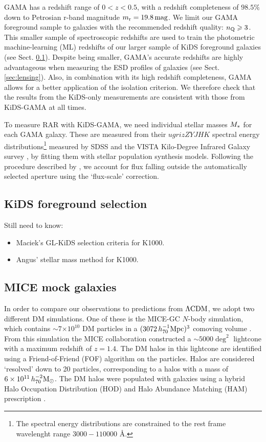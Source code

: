 \documentclass[usenatbib]{mnras}
\newcommand{\magn}{\, {\rm mag} }
\newcommand{\hsmsun}{\,h_{70}^{-2} {\rm M_\odot}}
\newcommand{\hsMpc}{\, h_{70}^{-1}{\rm{Mpc}} }
\newcommand{\lcdm}{{\rm \Lambda CDM}}
\newcommand*{\E}[1]{\times 10^{#1}}
\newcommand{\un}[1]{_{\rm #1}}
\begin{document}
GAMA has a redshift range of $0<z<0.5$, with a redshift completeness of $98.5\%$ down to Petrosian r-band magnitude $m\un{r} = 19.8 \magn$. We limit our GAMA foreground sample to galaxies with the recommended redshift quality: $n\un{Q}\geq3$. This smaller sample of spectroscopic redshifts are used to train the photometric machine-learning (ML) redshifts of our larger sample of KiDS foreground galaxies (see Sect. \ref{sec:gamalike_kids}). Despite being smaller, GAMA's accurate redshifts are highly advantageous when measuring the ESD profiles of galaxies (see Sect. \ref{sec:lensing}). Also, in combination with its high redshift completeness, GAMA allows for a better application of the isolation criterion. We therefore check that the results from the KiDS-only measurements are consistent with those from KiDS-GAMA at all times.

To measure RAR with KiDS-GAMA, we need individual stellar masses $M\un{*}$ for each GAMA galaxy. These are measured from their $ugrizZYJHK$ spectral energy distributions\footnote{The spectral energy distributions are constrained to the rest frame wavelenght range $3000-110000$ \AA.} measured by SDSS and the VISTA Kilo-Degree Infrared Galaxy survey \cite[VIKING,][]{edge2013}, by fitting them with \cite{bruzual2003} stellar population synthesis models. Following the procedure described by \cite{taylor2011}, we account for flux falling outside the automatically selected aperture using the `flux-scale' correction.

\subsection{KiDS foreground selection}
\label{sec:gamalike_kids}
Still need to know:
\begin{itemize}
	\item Maciek's GL-KiDS selection criteria for K1000.
	\item Angus' stellar mass method for K1000.
\end{itemize}

\subsection{MICE mock galaxies}
\label{sec:mice_mocks}

In order to compare our observations to predictions from $\lcdm$, we adopt two different DM simulations. One of these is the MICE-GC $N$-body simulation, which contains $\sim 7$$\E{10}$ DM particles in a $(3072 \hsMpc)^3$ comoving volume \cite[]{fosalba2015b}. From this simulation the MICE collaboration constructed a $\sim5000\deg^2$ lightcone with a maximum redshift of $z=1.4$. The DM halos in this lightcone are identified using a Friend-of-Friend (FOF) algorithm on the particles. Halos are considered `resolved' down to 20 particles, corresponding to a halos with a mass of $6\E{11} \hsmsun$. The DM halos were populated with galaxies using a hybrid Halo Occupation Distribution (HOD) and Halo Abundance Matching (HAM) prescription \cite[]{carretero2015,crocce2015}.
\end{document}
